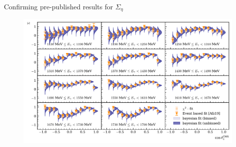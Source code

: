 \documentclass[11pt,aspectratio=169,dvipsnames]{beamer}
\begin{document}
	\begin{frame}{Confirming pre-published results for $\Sigma_\eta$}
		\begin{figure}
			\centering
			\includegraphics[width=.95\linewidth]{../../bayes/event_based_fit/plots/sigma_eta.pdf}
		\end{figure}
	\end{frame}
	
	
	
	
\end{document}

